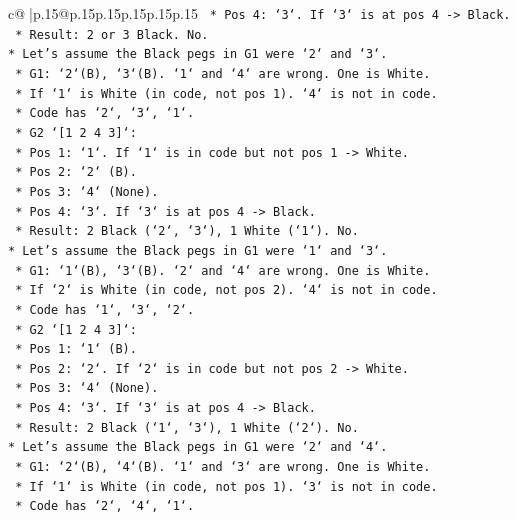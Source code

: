 \documentclass{article}
\begin{document}
{\begin{supertabular}{c@{$\;$}|p{.15\linewidth}@{}p{.15\linewidth}p{.15\linewidth}p{.15\linewidth}p{.15\linewidth}p{.15\linewidth}}
{{{\texttt{        *   Pos 4: `3`. If `3` is at pos 4 {-}> Black.} \\
\texttt{        *   Result: 2 or 3 Black. No.} \\
\texttt{*   Let's assume the Black pegs in G1 were `2` and `3`.} \\
\texttt{    *   G1: `2`(B), `3`(B). `1` and `4` are wrong. One is White.} \\
\texttt{    *   If `1` is White (in code, not pos 1). `4` is not in code.} \\
\texttt{    *   Code has `2`, `3`, `1`.} \\
\texttt{    *   G2 `{[}1 2 4 3{]}`:} \\
\texttt{        *   Pos 1: `1`. If `1` is in code but not pos 1 {-}> White.} \\
\texttt{        *   Pos 2: `2` (B).} \\
\texttt{        *   Pos 3: `4` (None).} \\
\texttt{        *   Pos 4: `3`. If `3` is at pos 4 {-}> Black.} \\
\texttt{        *   Result: 2 Black (`2`, `3`), 1 White (`1`). No.} \\
\texttt{*   Let's assume the Black pegs in G1 were `1` and `3`.} \\
\texttt{    *   G1: `1`(B), `3`(B). `2` and `4` are wrong. One is White.} \\
\texttt{    *   If `2` is White (in code, not pos 2). `4` is not in code.} \\
\texttt{    *   Code has `1`, `3`, `2`.} \\
\texttt{    *   G2 `{[}1 2 4 3{]}`:} \\
\texttt{        *   Pos 1: `1` (B).} \\
\texttt{        *   Pos 2: `2`. If `2` is in code but not pos 2 {-}> White.} \\
\texttt{        *   Pos 3: `4` (None).} \\
\texttt{        *   Pos 4: `3`. If `3` is at pos 4 {-}> Black.} \\
\texttt{        *   Result: 2 Black (`1`, `3`), 1 White (`2`). No.} \\
\texttt{*   Let's assume the Black pegs in G1 were `2` and `4`.} \\
\texttt{    *   G1: `2`(B), `4`(B). `1` and `3` are wrong. One is White.} \\
\texttt{    *   If `1` is White (in code, not pos 1). `3` is not in code.} \\
\texttt{    *   Code has `2`, `4`, `1`.} \\
}}}
\end{supertabular}}
\end{document}
